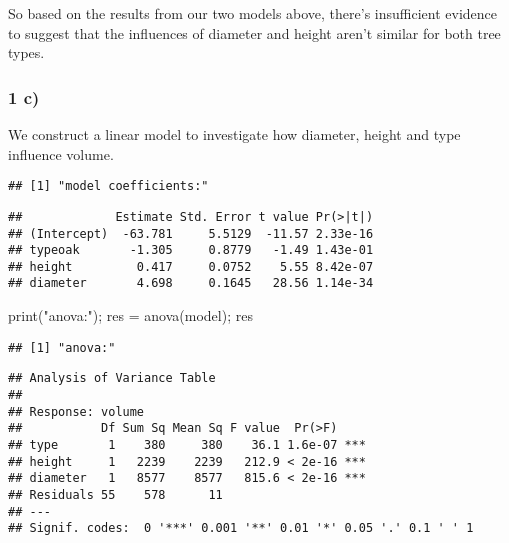 \documentclass[
  11pt,
]{article}
\newenvironment{Shaded}{\begin{snugshade}}{\end{snugshade}}
\newcommand{\AttributeTok}[1]{\textcolor[rgb]{0.77,0.63,0.00}{#1}}
\newcommand{\FunctionTok}[1]{\textcolor[rgb]{0.00,0.00,0.00}{#1}}
\newcommand{\NormalTok}[1]{#1}
\newcommand{\OtherTok}[1]{\textcolor[rgb]{0.56,0.35,0.01}{#1}}
\newcommand{\SpecialCharTok}[1]{\textcolor[rgb]{0.00,0.00,0.00}{#1}}
\newcommand{\StringTok}[1]{\textcolor[rgb]{0.31,0.60,0.02}{#1}}
\begin{document}
So based on the results from our two models above, there's insufficient
evidence to suggest that the influences of diameter and height aren't
similar for both tree types.

\hypertarget{c}{%
\subsubsection{1 c)}\label{c}}

We construct a linear model to investigate how diameter, height and type
influence volume.

\begin{Shaded}
\end{Shaded}

\begin{verbatim}
## [1] "model coefficients:"
\end{verbatim}

\begin{verbatim}
##             Estimate Std. Error t value Pr(>|t|)
## (Intercept)  -63.781     5.5129  -11.57 2.33e-16
## typeoak       -1.305     0.8779   -1.49 1.43e-01
## height         0.417     0.0752    5.55 8.42e-07
## diameter       4.698     0.1645   28.56 1.14e-34
\end{verbatim}

\begin{Shaded}
\begin{Highlighting}[]
\FunctionTok{print}\NormalTok{(}\StringTok{"anova:"}\NormalTok{); res }\OtherTok{=} \FunctionTok{anova}\NormalTok{(model); res}
\end{Highlighting}
\end{Shaded}

\begin{verbatim}
## [1] "anova:"
\end{verbatim}

\begin{verbatim}
## Analysis of Variance Table
## 
## Response: volume
##           Df Sum Sq Mean Sq F value  Pr(>F)    
## type       1    380     380    36.1 1.6e-07 ***
## height     1   2239    2239   212.9 < 2e-16 ***
## diameter   1   8577    8577   815.6 < 2e-16 ***
## Residuals 55    578      11                    
## ---
## Signif. codes:  0 '***' 0.001 '**' 0.01 '*' 0.05 '.' 0.1 ' ' 1
\end{verbatim}
\end{document}
